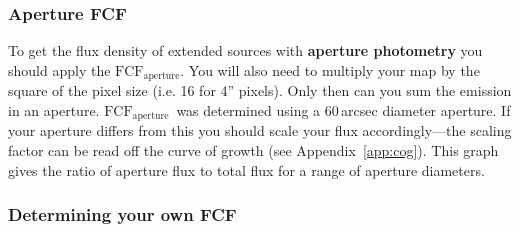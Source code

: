 \documentclass[twoside,11pt]{article}
\newcommand{\htmlref}[2]{#1}
\newcommand{\latexhtml}[2]{#1}
\renewcommand{\_}{\texttt{\symbol{95}}}
\newcommand{\fcfa}{$\mathrm{FCF_{aperture}}$}
\newcommand{\cref}[3]{\latexhtml{#1~\ref{#2}}{\htmlref{#3}{#2}}}
\begin{document}
\subsubsection{Aperture FCF}

To get the flux density of extended sources with \textbf{aperture
photometry} you should apply the \fcfa. You will also need to multiply
your map by the square of the pixel size (i.e. 16 for 4'' pixels).
Only then can you sum the emission in an aperture. \fcfa\ was
determined using a 60\,arcsec diameter aperture. If your aperture
differs from this you should scale your flux accordingly---the scaling
factor can be read off the curve of growth (see
\cref{Appendix}{app:cog}{Aperture Photometry Curve of Growth}). This
graph gives the ratio of aperture flux to total flux for a range of
aperture diameters.

\subsubsection{Determining your own FCF}
\end{document}
